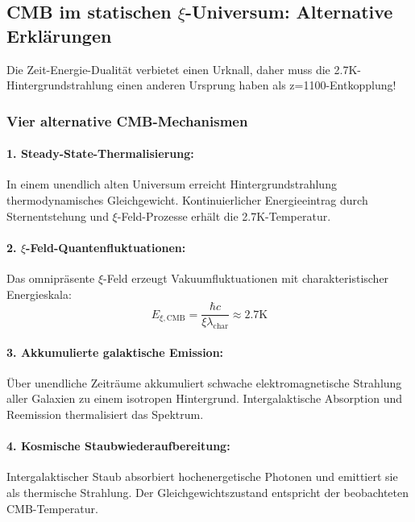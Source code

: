\documentclass[12pt,a4paper]{article}
\theoremstyle{definition}
\begin{document}
	\subsection{CMB im statischen $\xi$-Universum: Alternative Erklärungen}
	
	\begin{revolutionary}
		Die Zeit-Energie-Dualität verbietet einen Urknall, daher muss die 2.7K-Hintergrundstrahlung einen anderen Ursprung haben als z=1100-Entkopplung!
	\end{revolutionary}
	
	\subsubsection{Vier alternative CMB-Mechanismen}
	
	\paragraph{1. Steady-State-Thermalisierung:}
	In einem unendlich alten Universum erreicht Hintergrundstrahlung thermodynamisches Gleichgewicht. Kontinuierlicher Energieeintrag durch Sternentstehung und $\xi$-Feld-Prozesse erhält die 2.7K-Temperatur.
	
	\paragraph{2. $\xi$-Feld-Quantenfluktuationen:}
	Das omnipräsente $\xi$-Feld erzeugt Vakuumfluktuationen mit charakteristischer Energieskala:
	\begin{equation}
		E_{\xi,\text{CMB}} = \frac{\hbar c}{\xi \lambda_{\text{char}}} \approx \text{2.7K}
	\end{equation}
	
	\paragraph{3. Akkumulierte galaktische Emission:}
	Über unendliche Zeiträume akkumuliert schwache elektromagnetische Strahlung aller Galaxien zu einem isotropen Hintergrund. Intergalaktische Absorption und Reemission thermalisiert das Spektrum.
	
	\paragraph{4. Kosmische Staubwiederaufbereitung:}
	Intergalaktischer Staub absorbiert hochenergetische Photonen und emittiert sie als thermische Strahlung. Der Gleichgewichtszustand entspricht der beobachteten CMB-Temperatur.
	
\end{document}
